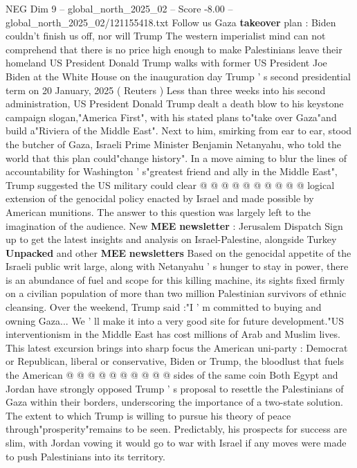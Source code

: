 \begin{textsample}{NEG Dim 9 – global\_north\_2025\_02 – Score -8.00 – global\_north\_2025\_02/121155418.txt}  \label{ex:f9_neg_004}
Follow us Gaza \textbf{takeover} plan : Biden couldn't finish us off, nor will Trump The western imperialist mind can not comprehend that there is no price high enough to make Palestinians leave their homeland US President Donald Trump walks with former US President Joe Biden at the White House on the inauguration day Trump ' s second presidential term on 20 January, 2025 ( Reuters ) Less than three weeks into his second administration, US President Donald Trump dealt a death blow to his keystone campaign slogan,"America First", with his stated plans to"take over Gaza"and build a"Riviera of the Middle East".
Next to him, smirking from ear to ear, stood the butcher of Gaza, Israeli Prime Minister Benjamin Netanyahu, who told the world that this plan could"change history".
In a move aiming to blur the lines of accountability for Washington ' s"greatest friend and ally in the Middle East", Trump suggested the US military could clear @ @ @ @ @ @ @ @ @ @ logical extension of the genocidal policy enacted by Israel and made possible by American munitions.
The answer to this question was largely left to the imagination of the audience.
New \textbf{MEE} \textbf{newsletter} : Jerusalem Dispatch Sign up to get the latest insights and analysis on Israel-Palestine, alongside Turkey \textbf{Unpacked} and other \textbf{MEE} \textbf{newsletters} Based on the genocidal appetite of the Israeli public writ large, along with Netanyahu ' s hunger to stay in power, there is an abundance of fuel and scope for this killing machine, its sights fixed firmly on a civilian population of more than two million Palestinian survivors of ethnic cleansing.
Over the weekend, Trump said :"I ' m committed to buying and owning Gaza...
We ' ll make it into a very good site for future development."US interventionism in the Middle East has cost millions of Arab and Muslim lives.
This latest excursion brings into sharp focus the American uni-party : Democrat or Republican, liberal or conservative, Biden or Trump, the bloodlust that fuels the American @ @ @ @ @ @ @ @ @ @ sides of the same coin Both Egypt and Jordan have strongly opposed Trump ' s proposal to resettle the Palestinians of Gaza within their borders, underscoring the importance of a two-state solution.
The extent to which Trump is willing to pursue his theory of peace through"prosperity"remains to be seen.
Predictably, his prospects for success are slim, with Jordan vowing it would go to war with Israel if any moves were made to push Palestinians into its territory.

\end{textsample}
